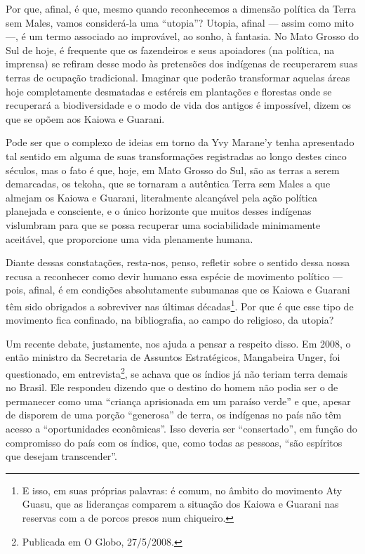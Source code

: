 Por que, afinal, é que, mesmo quando reconhecemos a dimensão política da
Terra sem Males, vamos considerá-la uma ``utopia''? Utopia, afinal —
assim como mito —, é um termo associado ao improvável, ao sonho, à
fantasia. No Mato Grosso do Sul de hoje, é frequente que os fazendeiros
e seus apoiadores (na política, na imprensa) se refiram desse modo às
pretensões dos indígenas de recuperarem suas terras de ocupação
tradicional. Imaginar que poderão transformar aquelas áreas hoje
completamente desmatadas e estéreis em plantações e florestas onde se
recuperará a biodiversidade e o modo de vida dos antigos é impossível,
dizem os que se opõem aos Kaiowa e Guarani.

Pode ser que o complexo de ideias em torno da Yvy Marane’y tenha
apresentado tal sentido em alguma de suas transformações registradas ao
longo destes cinco séculos, mas o fato é que, hoje, em Mato Grosso do
Sul, são as terras a serem demarcadas, os tekoha, que se tornaram a
autêntica Terra sem Males a que almejam os Kaiowa e Guarani,
literalmente alcançável pela ação política planejada e consciente, e o
único horizonte que muitos desses indígenas vislumbram para que se
possa recuperar uma sociabilidade minimamente aceitável, que
proporcione uma vida plenamente humana.

Diante dessas constatações, resta-nos, penso, refletir sobre o sentido
dessa nossa recusa a reconhecer como devir humano essa espécie de
movimento político — pois, afinal, é em condições absolutamente
subumanas que os Kaiowa e Guarani têm sido obrigados a sobreviver nas
últimas décadas\footnote{E isso, em suas próprias palavras: é comum, no
âmbito do movimento Aty Guasu, que as lideranças comparem a situação
dos Kaiowa e Guarani nas reservas com a de porcos presos num
chiqueiro.}. Por que é que esse tipo de movimento fica confinado, na
bibliografia, ao campo do religioso, da utopia?

Um recente debate, justamente, nos ajuda a pensar a respeito disso. Em
2008, o então ministro da Secretaria de Assuntos Estratégicos,
Mangabeira Unger, foi questionado, em entrevista\footnote{Publicada em
O Globo, 27/5/2008.}, se achava que os índios já não teriam terra
demais no Brasil. Ele respondeu dizendo que o destino do homem não
podia ser o de permanecer como uma ``criança aprisionada em um paraíso
verde'' e que, apesar de disporem de uma porção ``generosa'' de terra, os
indígenas no país não têm acesso a ``oportunidades econômicas''. Isso
deveria ser ``consertado'', em função do compromisso do país com os
índios, que, como todas as pessoas, ``são espíritos que desejam
transcender''.

